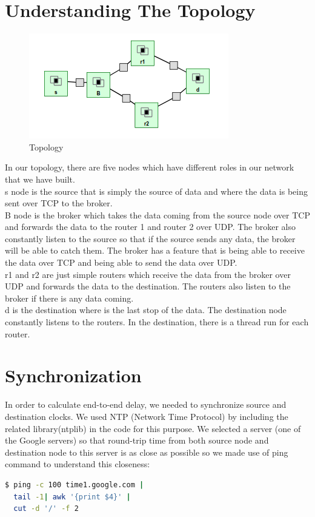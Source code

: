 \documentclass[conference]{IEEEtran}
\begin{document}
\section{Understanding The Topology}
\begin{figure}[ht]
  \includegraphics[width=\linewidth]{topology.png}
  \caption{Topology}
  \label{fig:boat1}
\end{figure}
In our topology, there are five nodes which have different roles in our network that we have built.\\
s node is the source that is simply the source of data and where the data is being sent over TCP to the broker.\\
B node is the broker which takes the data coming from the source node over TCP and forwards the data to the router 1 and router 2 over UDP. The broker also constantly listen to the source so that if the source sends any data, the broker will be able to catch them. The broker has a feature that is being able to receive the data over TCP and being able to send the data over UDP.\\
r1 and r2 are just simple routers which receive the data from the broker over UDP and forwards the data to the destination. The routers also listen to the broker if there is any data coming.\\
d is the destination where is the last stop of the data. The destination node constantly listens to the routers. In the destination, there is a thread run for each router. 

\section{Synchronization}
In order to calculate end-to-end delay, we needed to synchronize source and destination clocks. We used NTP (Network Time Protocol) by including the related library(ntplib) in the code for this purpose. We selected a server (one of the Google servers) so that round-trip time from both source node and destination node to this server is as close as possible so we made use of ping command to understand this closeness:
\begin{lstlisting}[language=bash]
  $ ping -c 100 time1.google.com |
  tail -1| awk '{print $4}' | 
  cut -d '/' -f 2
\end{lstlisting}
\end{document}
